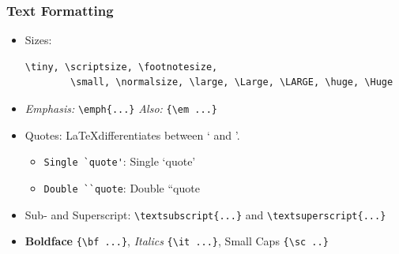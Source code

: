 \documentclass{beamer}
\begin{document}
\begin{frame}[containsverbatim]
    \frametitle{Text Formatting}
    \begin{itemize}
        \item Sizes: \begin{verbatim}\tiny, \scriptsize, \footnotesize, 
        \small, \normalsize, \large, \Large, \LARGE, \huge, \Huge\end{verbatim}
        \item \emph{Emphasis:} \verb|\emph{...}| {\em Also:} \verb|{\em ...}|
        \item Quotes: \LaTeX differentiates between ` and '.
        \begin{itemize}
            \item \verb|Single `quote'|: Single `quote'
            \item \verb|Double ``quote|: Double ``quote
        \end{itemize}
        \item Sub- and Superscript: \verb|\textsubscript{...}| and \verb|\textsuperscript{...}|
        \item {\bf Boldface} \verb|{\bf ...}|, {\it Italics} \verb|{\it ...}|, {\sc Small Caps} \verb|{\sc ..}| 
    \end{itemize}
\end{frame}
\end{document}
